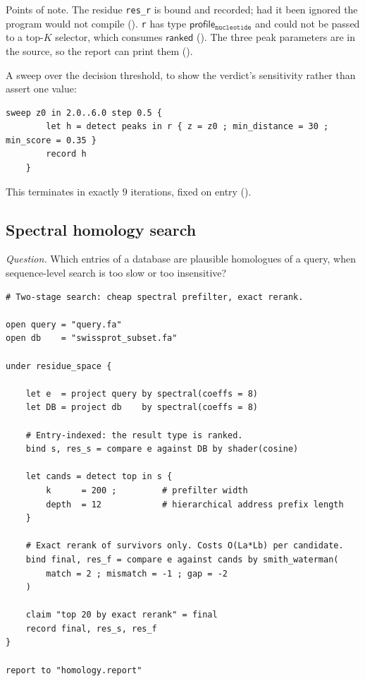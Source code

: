 \documentclass[11pt,twocolumn,a4paper]{article}
\theoremstyle{plain}
\theoremstyle{definition}
\theoremstyle{remark}
\newcommand{\typ}[1]{\ensuremath{\mathsf{#1}}}
\begin{document}
Points of note. The residue \texttt{res\_r} is bound and recorded; had
it been ignored the program would not compile
(). \texttt{r} has type \typ{profile}$_{\texttt{nucleotide}}$
and could not be passed to a top-$K$ selector, which consumes
\typ{ranked} (). The three peak parameters are in the
source, so the report can print them ().

A sweep over the decision threshold, to show the verdict's sensitivity
rather than assert one value:

\begin{lstlisting}[style=nonum]
    sweep z0 in 2.0..6.0 step 0.5 {
        let h = detect peaks in r { z = z0 ; min_distance = 30 ; min_score = 0.35 }
        record h
    }
\end{lstlisting}

\noindent This terminates in exactly $9$ iterations, fixed on entry
().

\subsection{Spectral homology search}
\label{sec:prog-homology}

\emph{Question.} Which entries of a database are plausible homologues of
a query, when sequence-level search is too slow or too insensitive?

\begin{lstlisting}[caption={\texttt{homology.syp}}]
# Two-stage search: cheap spectral prefilter, exact rerank.

open query = "query.fa"
open db    = "swissprot_subset.fa"

under residue_space {

    let e  = project query by spectral(coeffs = 8)
    let DB = project db    by spectral(coeffs = 8)

    # Entry-indexed: the result type is ranked.
    bind s, res_s = compare e against DB by shader(cosine)

    let cands = detect top in s {
        k      = 200 ;         # prefilter width
        depth  = 12            # hierarchical address prefix length
    }

    # Exact rerank of survivors only. Costs O(La*Lb) per candidate.
    bind final, res_f = compare e against cands by smith_waterman(
        match = 2 ; mismatch = -1 ; gap = -2
    )

    claim "top 20 by exact rerank" = final
    record final, res_s, res_f
}

report to "homology.report"
\end{lstlisting}
\end{document}
